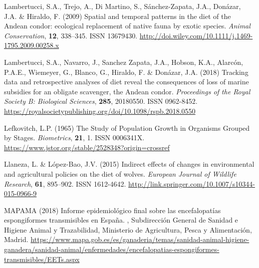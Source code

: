 \documentclass[12pt]{article}
\begin{document}
\begin{thebibliography}{87}
	Lambertucci, S.A., Trejo, A., {Di Martino}, S., S{\'{a}}nchez-Zapata, J.A.,
	Don{\'{a}}zar, J.A. \& Hiraldo, F. (2009) {Spatial and temporal patterns in
		the diet of the Andean condor: ecological replacement of native fauna by
		exotic species}.
	\newblock \emph{Animal Conservation}, \textbf{12}, 338--345.
	\newblock ISSN 13679430.
	\newline\urlprefix\url{http://doi.wiley.com/10.1111/j.1469-1795.2009.00258.x}
	
	Lambertucci, S.A., Navarro, J., {Sanchez Zapata}, J.A., Hobson, K.A.,
	Alarc{\'{o}}n, P.A.E., Wiemeyer, G., Blanco, G., Hiraldo, F. \&
	Don{\'{a}}zar, J.A. (2018) {Tracking data and retrospective analyses of diet
		reveal the consequences of loss of marine subsidies for an obligate
		scavenger, the Andean condor}.
	\newblock \emph{Proceedings of the Royal Society B: Biological Sciences},
	\textbf{285}, 20180550.
	\newblock ISSN 0962-8452.
	\newline\urlprefix\url{https://royalsocietypublishing.org/doi/10.1098/rspb.2018.0550}
	
	Lefkovitch, L.P. (1965) {The Study of Population Growth in Organisms Grouped by
		Stages}.
	\newblock \emph{Biometrics}, \textbf{21}, 1.
	\newblock ISSN 0006341X.
	\newline\urlprefix\url{https://www.jstor.org/stable/2528348?origin=crossref}
	
	Llaneza, L. \& L{\'{o}}pez-Bao, J.V. (2015) {Indirect effects of changes in
		environmental and agricultural policies on the diet of wolves}.
	\newblock \emph{European Journal of Wildlife Research}, \textbf{61}, 895--902.
	\newblock ISSN 1612-4642.
	\newline\urlprefix\url{http://link.springer.com/10.1007/s10344-015-0966-9}
	
	MAPAMA (2018) {Informe epidemiol{\'{o}}gico final sobre las
		encefalopat{\'{i}}as espongiformes transmisibles en Espa{\~{n}}a}.
	\newblock , Subdirecci{\'{o}}n General de Sanidad e Higiene Animal y
	Trazabilidad, Ministerio de Agricultura, Pesca y Alimentaci{\'{o}}n, Madrid.
	\newline\urlprefix\url{https://www.mapa.gob.es/es/ganaderia/temas/sanidad-animal-higiene-ganadera/sanidad-animal/enfermedades/encefalopatias-espongiformes-transmisibles/EETs.aspx}
	

\end{thebibliography}
\end{document}
